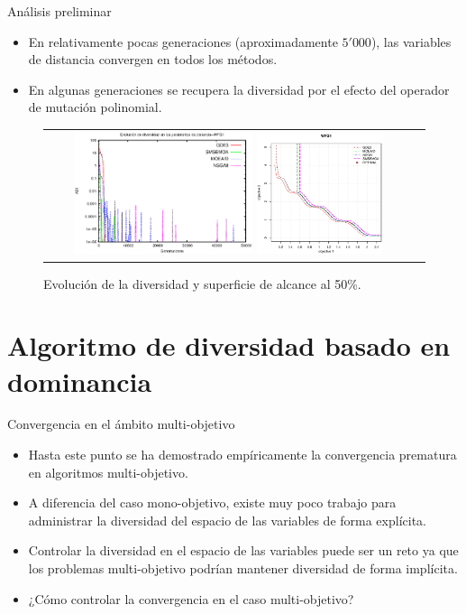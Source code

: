 \documentclass{beamer}
\begin{document}
\begin{frame}{Análisis preliminar}
\begin{itemize}
\justifying
\item En relativamente pocas generaciones (aproximadamente $5'000$), las variables de distancia convergen en todos los métodos.
\justifying
\item En algunas generaciones se recupera la diversidad por el efecto del operador de mutación polinomial.
\end{itemize}

\begin{figure}
\centering
\begin{tabular}{cc}
 \includegraphics[width=0.5\textwidth]{Images/Average_DistanceParamsStateArt.eps} 
\includegraphics[width=0.35\textwidth]{Images/WFG1_analisis.eps} %
\end{tabular}
\caption{Evolución de la diversidad y superficie de alcance al 50\%.}
\label{fig:DiversityProposal}
\end{figure}
\end{frame}



\section{Algoritmo de diversidad basado en dominancia}

\begin{frame}{Convergencia en el ámbito multi-objetivo}
    \begin{itemize}
        \item Hasta este punto se ha demostrado empíricamente la convergencia prematura en algoritmos multi-objetivo.
	\item A diferencia del caso mono-objetivo, existe muy poco trabajo para administrar la diversidad del espacio de las variables de forma explícita.
	\item Controlar la diversidad en el espacio de las variables puede ser un reto ya que los problemas multi-objetivo podrían mantener diversidad de forma implícita.
	\item ¿Cómo controlar la convergencia en el caso multi-objetivo?
    \end{itemize}
\end{frame}
\end{document}
